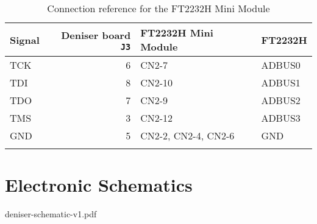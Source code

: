 \documentclass[10pt]{datasheet}
\newcommand{\proj}{Deniser board}
\begin{document}
\begin{table}[H]
\caption{Connection reference for the FT2232H Mini Module}
\label{mini}
\begin{tabularx}{\textwidth}{ l r l X }
    \thickhline
    \textbf{Signal} & \textbf{\proj{} \texttt{J3}} & \textbf{FT2232H Mini Module} & \textbf{FT2232H} \\
    \hline
    TCK & 6   & CN2-7   & ADBUS0 \\
    TDI & 8   & CN2-10  & ADBUS1 \\
    TDO & 7   & CN2-9   & ADBUS2 \\
    TMS & 3   & CN2-12  & ADBUS3 \\
    \hline
    GND & 5   & CN2-2, CN2-4, CN2-6   & GND \\
    \thickhline
\end{tabularx}
\end{table}

\clearpage
\section{Electronic Schematics}
\label{sch}
\begin{center}
  \begin{includegraphics}[width=1.0\textwidth]{deniser-schematic-v1.pdf}
  \end{includegraphics}
\end{center}

\clearpage
\end{document}
